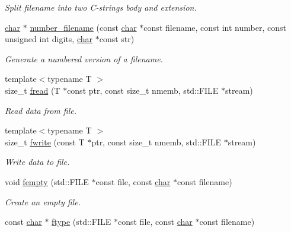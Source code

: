 \begin{DoxyCompactItemize}
\begin{DoxyCompactList}\small\item\em Split filename into two C-\/strings {\ttfamily body} and {\ttfamily extension}. \end{DoxyCompactList}\item 
\mbox{\label{namespacecimg__library__suffixed_1_1cimg_ab58f430d4a05a010742c012efd4a7000}} 
\hyperlink{classchar}{char} $\ast$ \hyperlink{namespacecimg__library__suffixed_1_1cimg_ab58f430d4a05a010742c012efd4a7000}{number\+\_\+filename} (const \hyperlink{classchar}{char} $\ast$const filename, const int number, const unsigned int digits, \hyperlink{classchar}{char} $\ast$const str)
\begin{DoxyCompactList}\small\item\em Generate a numbered version of a filename. \end{DoxyCompactList}\item 
{\footnotesize template$<$typename T $>$ }\\size\+\_\+t \hyperlink{namespacecimg__library__suffixed_1_1cimg_a6b210044fcdb52b1d649ab19006de4ad}{fread} (T $\ast$const ptr, const size\+\_\+t nmemb, std\+::\+F\+I\+LE $\ast$stream)
\begin{DoxyCompactList}\small\item\em Read data from file. \end{DoxyCompactList}\item 
{\footnotesize template$<$typename T $>$ }\\size\+\_\+t \hyperlink{namespacecimg__library__suffixed_1_1cimg_ad44a7e96cd1e9cdef83f4ffe235dd1fb}{fwrite} (const T $\ast$ptr, const size\+\_\+t nmemb, std\+::\+F\+I\+LE $\ast$stream)
\begin{DoxyCompactList}\small\item\em Write data to file. \end{DoxyCompactList}\item 
void \hyperlink{namespacecimg__library__suffixed_1_1cimg_a0f3577978081461118330fc3ecd4b9db}{fempty} (std\+::\+F\+I\+LE $\ast$const file, const \hyperlink{classchar}{char} $\ast$const filename)
\begin{DoxyCompactList}\small\item\em Create an empty file. \end{DoxyCompactList}\item 
const \hyperlink{classchar}{char} $\ast$ \hyperlink{namespacecimg__library__suffixed_1_1cimg_a56c2dbfe99d9f6e6bc1be9d03b0ddaaa}{ftype} (std\+::\+F\+I\+LE $\ast$const file, const \hyperlink{classchar}{char} $\ast$const filename)

\end{DoxyCompactItemize}
